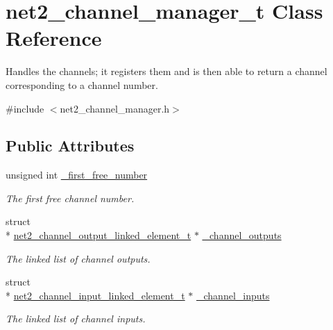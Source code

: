 \hypertarget{structnet2__channel__manager__t}{\section{net2\-\_\-channel\-\_\-manager\-\_\-t Class Reference}
\label{structnet2__channel__manager__t}
}


Handles the channels; it registers them and is then able to return a channel corresponding to a channel number.  




{\ttfamily \#include $<$net2\-\_\-channel\-\_\-manager.\-h$>$}

\subsection*{Public Attributes}
\begin{DoxyCompactItemize}
\item 
\hypertarget{structnet2__channel__manager__t_ac72dfb3a1c1536e556ef3c3cb6a2fa00}{unsigned int \hyperlink{structnet2__channel__manager__t_ac72dfb3a1c1536e556ef3c3cb6a2fa00}{\-\_\-first\-\_\-free\-\_\-number}}\label{structnet2__channel__manager__t_ac72dfb3a1c1536e556ef3c3cb6a2fa00}

\begin{DoxyCompactList}\small\item\em The first free channel number. \end{DoxyCompactList}\item 
\hypertarget{structnet2__channel__manager__t_a994bf9242cb70c45711e2a670123a18e}{struct \\*
\hyperlink{structnet2__channel__output__linked__element__t}{net2\-\_\-channel\-\_\-output\-\_\-linked\-\_\-element\-\_\-t} $\ast$ \hyperlink{structnet2__channel__manager__t_a994bf9242cb70c45711e2a670123a18e}{\-\_\-channel\-\_\-outputs}}\label{structnet2__channel__manager__t_a994bf9242cb70c45711e2a670123a18e}

\begin{DoxyCompactList}\small\item\em The linked list of channel outputs. \end{DoxyCompactList}\item 
\hypertarget{structnet2__channel__manager__t_a3e16fdcf5489413c2fabc6c009545ae1}{struct \\*
\hyperlink{structnet2__channel__input__linked__element__t}{net2\-\_\-channel\-\_\-input\-\_\-linked\-\_\-element\-\_\-t} $\ast$ \hyperlink{structnet2__channel__manager__t_a3e16fdcf5489413c2fabc6c009545ae1}{\-\_\-channel\-\_\-inputs}}\label{structnet2__channel__manager__t_a3e16fdcf5489413c2fabc6c009545ae1}

\begin{DoxyCompactList}\small\item\em The linked list of channel inputs. \end{DoxyCompactList}\end{DoxyCompactItemize}



